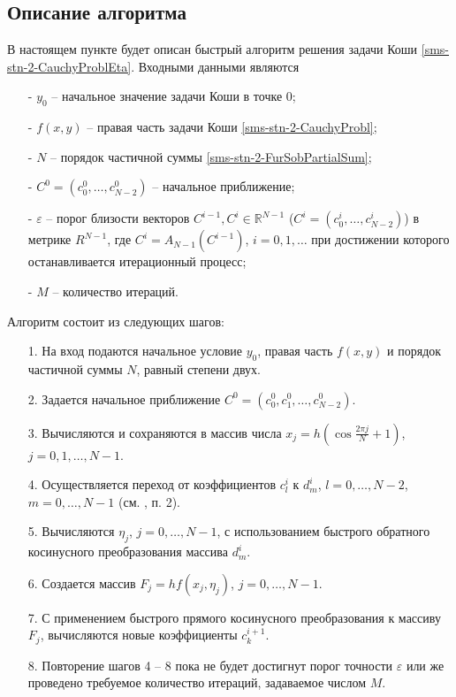 \subsection{Описание алгоритма}
В настоящем пункте будет описан быстрый алгоритм решения задачи Коши \eqref{sms-stn-2-CauchyProblEta}. Входными данными являются
{
	\renewcommand{\labelitemi}{$\circ$}
	\begin{itemize}
		\item[-] $y_0$ -- начальное значение задачи Коши в точке 0;
		\item[-] $f(x,y)$ -- правая часть задачи Коши \eqref{sms-stn-2-CauchyProbl};
		\item[-] $N$  -- порядок частичной суммы \eqref{sms-stn-2-FurSobPartialSum};
		
		\item[-] $C^0=(c^0_0,\ldots,c^0_{N-2})$ -- начальное приближение;
		\item[-] $\varepsilon$ -- порог близости векторов $C^{i-1},C^i\in\mathbb{R}^{N-1}$ ($C^i=(c^i_0,\ldots,c^i_{N-2})$) в метрике $R^{N-1}$, где $C^i=A_{N-1}(C^{i-1})$, $i=0,1,\dots$ при достижении которого останавливается итерационный процесс;
		\item[-] $M$ -- количество итераций.
	\end{itemize}
}
Алгоритм состоит из следующих шагов:
\begin{enumerate}
	\item[1.] На вход подаются начальное условие $y_0$, правая часть $f(x,y)$ и порядок частичной суммы $N$, равный степени двух.
	\item[2.] Задается начальное приближение $C^0=(c_0^0,c_1^0,\ldots,c_{N-2}^0)$.
	\item[3.] Вычисляются и сохраняются в массив числа $x_j=h(\cos\frac{2\pi j}N+1)$, $j=0,1,\ldots,N-1$.
	\item[4.] Осуществляется переход от коэффициентов $c_l^i$ к $d_m^i$, $l=0,\ldots,N-2$, $m=0,\ldots,N-1$ (см. \cite{sms-stn-2-demiSMS_ShTN}, п. 2).
	\item[5.] Вычисляются $\eta_j$, $j=0,\ldots,N-1$, с использованием быстрого обратного косинусного преобразования массива $d_m^i$.
	\item[6.] Создается массив $F_j=hf(x_j,\eta_j)$, $j=0,\ldots,N-1$.
	\item[7.] С применением быстрого прямого косинусного преобразования к массиву $F_j$, вычисляются новые коэффициенты $c_k^{i+1}$.
	\item[8.] Повторение шагов 4 -- 8 пока не будет достигнут порог точности $\varepsilon$ или же проведено требуемое количество итераций, задаваемое числом $M$.
\end{enumerate}

